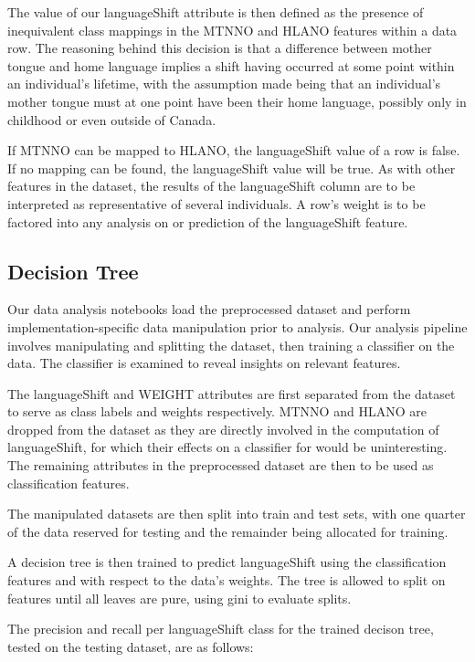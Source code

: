 \documentclass[10pt, conference, compsocconf]{IEEEtran}
\begin{document}
The value of our languageShift attribute is then defined as the presence of inequivalent class mappings in the MTNNO and HLANO features within a data row.  The reasoning behind this decision is that a difference between mother tongue and home language implies a shift having occurred at some point within an individual's lifetime, with the assumption made being that an individual's mother tongue must at one point have been their home language, possibly only in childhood or even outside of Canada.

If MTNNO can be mapped to HLANO, the languageShift value of a row is false.  If no mapping can be found, the languageShift value will be true.  As with other features in the dataset, the results of the languageShift column are to be interpreted as representative of several individuals.  A row's weight is to be factored into any analysis on or prediction of the languageShift feature.


\subsection{Decision Tree}

Our data analysis notebooks load the preprocessed dataset and perform implementation-specific data manipulation prior to analysis.  Our analysis pipeline involves manipulating and splitting the dataset, then training a classifier on the data.  The classifier is examined to reveal insights on relevant features.

The languageShift and WEIGHT attributes are first separated from the dataset to serve as class labels and weights respectively.  MTNNO and HLANO are dropped from the dataset as they are directly involved in the computation of languageShift, for which their effects on a classifier for would be uninteresting.  The remaining attributes in the preprocessed dataset are then to be used as classification features.

The manipulated datasets are then split into train and test sets, with one quarter of the data reserved for testing and the remainder being allocated for training.

A decision tree is then trained to predict languageShift using the classification features and with respect to the data's weights.  The tree is allowed to split on features until all leaves are pure, using gini to evaluate splits.

The precision and recall per languageShift class for the trained decison tree, tested on the testing dataset, are as follows:\\\
\end{document}

